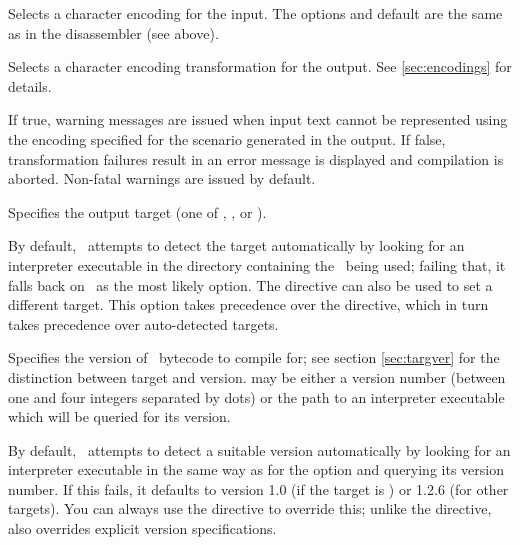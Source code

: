   \begin{nicelist}
  \item[\clbarg{e}{encoding}{ENC}]
    Selects a character encoding for the input.  The options and default are the
    same as in the disassembler (see above).
  \item[\clbarg{x}{transform-output}{ENC}]
    Selects a character encoding transformation for the output. See 
    \ref{sec:encodings} for details.
  \item[\clbarg{}{force-transform}{BOOL}]
    If true, warning messages are issued when input text cannot be represented
	using the encoding specified for the scenario generated in the output.
	If false, transformation failures result in an error message is displayed
	and compilation is aborted.  Non-fatal warnings are issued by default.

  \item[\clbarg{t}{target}{TARGET}]
    Specifies the output target (one of , , or
    ).
    
    By default, \compiler\ attempts to detect the target automatically by 
    looking for an interpreter executable in the directory containing the 
    \gameexe\ being used; failing that, it falls back on \reallive\ as the 
    most likely option.  The  directive can also be used to set a 
    different target.  This option takes precedence over the directive, which in 
    turn takes precedence over auto-detected targets.
  \item[\clbarg{f}{target-version}{VER}]
    Specifies the version of \reallive\ bytecode to compile for; see section
    \ref{sec:targver} for the distinction between target and version.  
    may be either a version number (between one and four integers separated by
    dots) or the path to an interpreter executable which will be queried for
    its version.
    
    By default, \compiler\ attempts to detect a suitable version automatically 
    by looking for an interpreter executable in the same way as for the 
     option and querying its version number.  If this fails, it 
    defaults to version 1.0 (if the target is \avgns) or 1.2.6 (for other 
    targets). You can always use the  directive to override 
    this; unlike the  directive,  also overrides 
    explicit version specifications.
  \end{nicelist}

